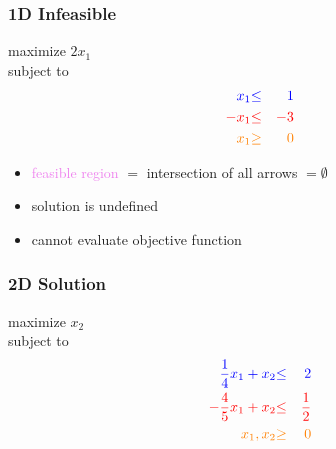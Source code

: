 \documentclass[10pt,aspectratio=169]{beamer}
\begin{document}
\begin{frame} \frametitle{1D Infeasible}
  maximize $2 x_1$ \\
  subject to
  \begin{eqnarray*}
    \textcolor{blue}{x_1} &\textcolor{blue}{\leq}& \textcolor{blue}{1} \\
    \textcolor{red}{-x_1} &\textcolor{red}{\leq}& \textcolor{red}{-3} \\
    \textcolor{orange}{x_1} &\textcolor{orange}{\geq}& \textcolor{orange}{0}
  \end{eqnarray*}

  \begin{center}
  \end{center}
  \begin{itemize}
    \item \textcolor{violet}{feasible region} $=$ intersection of all arrows
      $= \emptyset$
    \item solution is undefined
    \item cannot evaluate objective function
  \end{itemize}

\end{frame}

\begin{frame} \frametitle{2D Solution}
  maximize $x_2$ \\
  subject to
  \begin{eqnarray*}
    \textcolor{blue}{\frac{1}{4} x_1 + x_2} &\textcolor{blue}{\leq}& \textcolor{blue}{2} \\
    \textcolor{red}{-\frac{4}{5} x_1 + x_2} &\textcolor{red}{\leq}& \textcolor{red}{\frac{1}{2}} \\
    \textcolor{orange}{x_1, x_2} &\textcolor{orange}{\geq}& \textcolor{orange}{0}
  \end{eqnarray*}
\end{frame}
\end{document}
